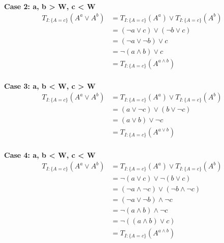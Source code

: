 \documentclass[part1.tex]{subfiles}
\begin{document}
{\bfseries Case 2: a, b > W, c < W}
\begin{align*}
        T_{I:\{A = c\}}(A^{a} \vee A^{b}) 
                 &= T_{I:\{A = c\}}(A^{a}) \vee T_{I:\{A = c\}}(A^{b}) \\
                 &= (\neg{a} \vee c) \vee (\neg{b} \vee c) \\
                 &= (\neg{a} \vee \neg{b}) \vee c \\
                 &= \neg{(a \wedge b)} \vee c \\
                 &= T_{I:\{A = c\}}(A^{a \wedge b}) \\
\end{align*}

{\bfseries Case 3: a, b < W, c > W}
\begin{align*}
        T_{I:\{A = c\}}(A^{a} \vee A^{b}) 
                 &= T_{I:\{A = c\}}(A^{a}) \vee T_{I:\{A = c\}}(A^{b}) \\
                 &= (a \vee \neg{c}) \vee (b \vee \neg{c}) \\
                 &= (a \vee b) \vee \neg{c} \\
                 &= T_{I:\{A = c\}}(A^{a \vee b}) \\
\end{align*}

{\bfseries Case 4: a, b < W, c < W}
\begin{align*}
        T_{I:\{A = c\}}(A^{a} \vee A^{b}) 
                 &= T_{I:\{A = c\}}(A^{a}) \vee T_{I:\{A = c\}}(A^{b}) \\
                 &= \neg{(a \vee c)} \vee \neg{(b \vee c)} \\
                 &= (\neg{a} \wedge \neg{c}) \vee (\neg{b} \wedge \neg{c})\\
                 &= (\neg{a} \vee \neg{b}) \wedge \neg{c}\\
                 &= \neg{(a \wedge b)} \wedge \neg{c}\\
                 &= \neg{((a \wedge b) \vee c)}\\
                 &= T_{I:\{A = c\}}(A^{a \wedge b}) \\
\end{align*}
\end{document}
